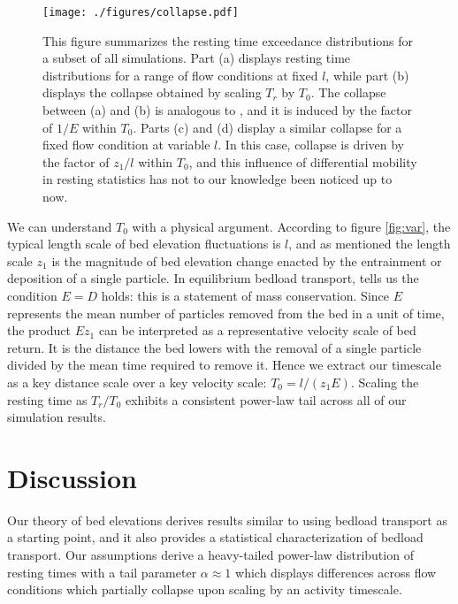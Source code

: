 \documentclass[draft]{agujournal2018}
\begin{document}
\begin{figure}[t!] %
  \texttt{[image: ./figures/collapse.pdf]}
  \caption{This figure summarizes the resting time exceedance distributions for a subset of all simulations. Part (a) displays resting time distributions for a range of flow conditions at fixed $l$, while part (b) displays the collapse obtained by scaling $T_r$ by $T_0$. The collapse between (a) and (b) is analogous to \citet{Martin2014}, and it is induced by the factor of $1/E$ within $T_0$. Parts (c) and (d) display a similar collapse for a fixed flow condition at variable $l$. In this case, collapse is driven by the factor of $z_1/l$ within $T_0$, and this influence of differential mobility in resting statistics has not to our knowledge been noticed up to now.}
\vspace{-1.0cm}
  \label{fig:collapse}
\end{figure}

We can understand $T_0$ with a physical argument.
According to figure \ref{fig:var}, the typical length scale of bed elevation fluctuations is $l$, and as mentioned the length scale $z_1$ is the magnitude of bed elevation change enacted by the entrainment or deposition of a single particle.  
In equilibrium bedload transport, \citet{Einstein1950} tells us the condition $E=D$ holds: this is a statement of mass conservation. 
Since $E$ represents the mean number of particles removed from the bed in a unit of time, the product $E z_1$ can be interpreted as a representative velocity scale of bed return. 
It is the distance the bed lowers with the removal of a single particle divided by the mean time required to remove it.
Hence we extract our timescale as a key distance scale over a key velocity scale: $T_0 = l/(z_1 E).$ 
Scaling the resting time as $T_r/T_0$ exhibits a consistent power-law tail across all of our simulation results. 

\section{Discussion}

Our theory of bed elevations derives results similar to \citet{Martin2014} using bedload transport as a starting point, and it also provides a statistical characterization of bedload transport.
Our assumptions derive a heavy-tailed power-law distribution of resting times with a tail parameter $\alpha \approx 1$ which displays differences across flow conditions which partially collapse upon scaling by an activity timescale.
\end{document}
